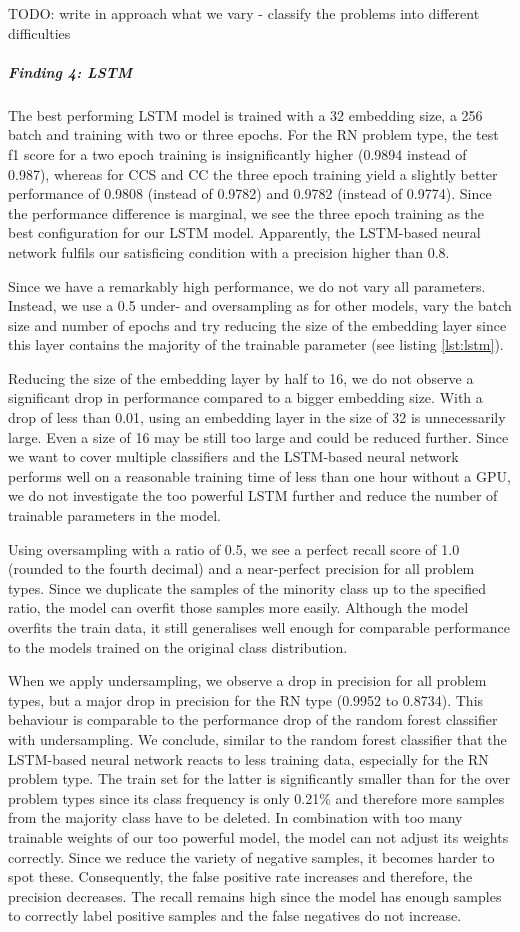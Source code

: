 TODO: write in approach what we vary
- classify the problems into different difficulties

\subparagraph{Finding 4: LSTM}
The best performing LSTM model is trained with a 32 embedding size, a 256 batch and training with two or three epochs. For the RN problem type, the test f1 score for a two epoch training is insignificantly higher (0.9894 instead of 0.987), whereas for CCS and CC the three epoch training yield a slightly better performance of 0.9808 (instead of 0.9782) and 0.9782 (instead of 0.9774). Since the performance difference is marginal, we see the three epoch training as the best configuration for our LSTM model. Apparently, the LSTM-based neural network fulfils our satisficing condition with a precision higher than 0.8.

Since we have a remarkably high performance, we do not vary all parameters. Instead, we use a 0.5 under- and oversampling as for other models, vary the batch size and number of epochs and try reducing the size of the embedding layer since this layer contains the majority of the trainable parameter (see listing \ref{lst:lstm}).

Reducing the size of the embedding layer by half to 16, we do not observe a significant drop in performance compared to a bigger embedding size. With a drop of less than 0.01, using an embedding layer in the size of 32 is unnecessarily large. Even a size of 16 may be still too large and could be reduced further. Since we want to cover multiple classifiers and the LSTM-based neural network performs well on a reasonable training time of less than one hour without a GPU, we do not investigate the too powerful LSTM further and reduce the number of trainable parameters in the model. 

Using oversampling with a ratio of 0.5, we see a perfect recall score of 1.0 (rounded to the fourth decimal) and a near-perfect precision for all problem types. Since we duplicate the samples of the minority class up to the specified ratio, the model can overfit those samples more easily. Although the model overfits the train data, it still generalises well enough for comparable performance to the models trained on the original class distribution.

When we apply undersampling, we observe a drop in precision for all problem types, but a major drop in precision for the RN type (0.9952 to 0.8734). This behaviour is comparable to the performance drop of the random forest classifier with undersampling. We conclude, similar to the random forest classifier that the LSTM-based neural network reacts to less training data, especially for the RN problem type. The train set for the latter is significantly smaller than for the over problem types since its class frequency is only 0.21\% and therefore more samples from the majority class have to be deleted. In combination with too many trainable weights of our too powerful model, the model can not adjust its weights correctly. Since we reduce the variety of negative samples, it becomes harder to spot these. Consequently, the false positive rate increases and therefore, the precision decreases. The recall remains high since the model has enough samples to correctly label positive samples and the false negatives do not increase.


